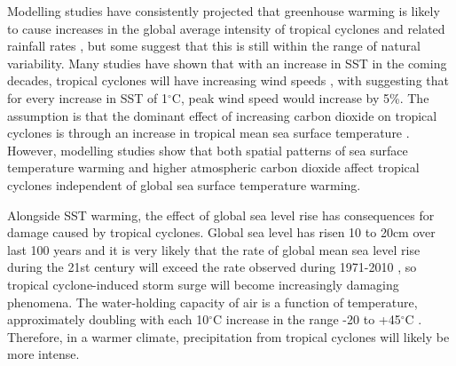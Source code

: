 Modelling studies have consistently projected that greenhouse warming is likely to cause increases in the global average intensity of tropical cyclones and related rainfall rates \citep[e.g.][]{hill2011impact, knutson2010tropical, elsner2008increasing, bender2010modeled}, but some suggest that this is still within the range of natural variability. Many studies have shown that with an increase in SST in the coming decades, tropical cyclones will have increasing wind speeds \citep{bender2010modeled, murakami2012future, webster2005changes, emanuel2005increasing, knutson2010tropical, elsner2008increasing}, with \cite{emanuel2005increasing} suggesting that for every increase in SST of 1$^{\circ}$C, peak wind speed would increase by 5\%. The assumption is that the dominant effect of increasing carbon dioxide on tropical cyclones is through an increase in tropical mean sea surface temperature \citep{zhao2013robust}. However, modelling studies show that both spatial patterns of sea surface temperature warming and higher atmospheric carbon dioxide affect tropical cyclones independent of global sea surface temperature warming. %

Alongside SST warming, the effect of global sea level rise has consequences for damage caused by tropical cyclones. Global sea level has risen 10 to 20cm over last 100 years \citep{solomon2007climate} and it is very likely that the rate of global mean sea level rise during the 21st century will exceed the rate observed during 1971-2010 \citep{church2013sea}, so tropical cyclone-induced storm surge will become increasingly damaging phenomena. The water-holding capacity of air is a function of temperature, approximately doubling with each 10$^{\circ}$C increase in the range -20 to +45$^{\circ}$C \citep{fowler1995potential}. Therefore, in a warmer climate, precipitation from tropical cyclones will likely be more intense.


